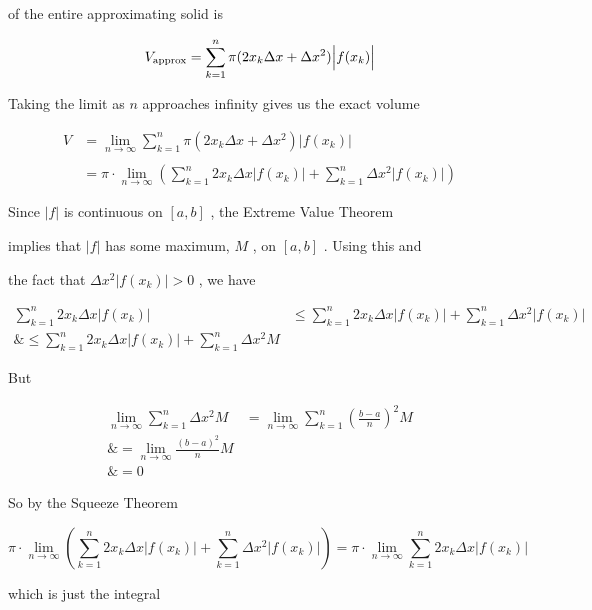 of the entire approximating solid is



$$V _{\rm approx}=\sum _{k=1}^n \pi(2x _k\Delta x+\Delta x^2)\Big|f(x _k)\Big|$$

Taking the limit as $n$ approaches infinity gives us the exact volume



\begin{align} V &= \lim _{n\to\infty}\sum _{k=1}^n \pi(2x _k\Delta x + \Delta x^2)\Big|f(x _k)\Big| \\\\ &= \pi\cdot\lim _{n\to\infty}\left(\sum _{k=1}^n 2x _k\Delta x\Big|f(x _k)\Big| + \sum _{k=1}^n \Delta x^2\Big|f(x _k)\Big|\right) \end{align} 

Since $|f|$ is continuous on $[a,b]$ , the Extreme Value Theorem

implies that $|f|$ has some maximum, $M$ , on $[a,b]$ . Using this and

the fact that $\Delta x^2\Big|f(x _k)\Big|>0$ , we have



\begin{align}
\sum _{k=1}^n 2x _k\Delta x\Big|f(x _k)\Big| &\le \sum _{k=1}^n 2x _k\Delta x\Big|f(x _k)\Big| + \sum _{k=1}^n \Delta x^2\Big|f(x _k)\Big| \\\&\le \sum _{k=1}^n 2x _k\Delta x\Big|f(x _k)\Big| + \sum _{k=1}^n \Delta x^2 M
\end{align}



But



\begin{align}
\lim _{n\to\infty}\sum _{k=1}^n \Delta x^2 M 

&= \lim _{n\to\infty}\sum _{k=1}^n \left(\frac{b-a}{n}\right)^2 M \\\&= \lim _{n\to\infty}\frac{(b-a)^2}{n} M \\\&= 0
\end{align}



So by the Squeeze Theorem



$$\pi\cdot\lim _{n\to\infty}\left(\sum _{k=1}^n 2x _k\Delta x\Big|f(x _k)\Big|+\sum _{k=1}^n \Delta x^2\Big|f(x _k)\Big|\right)=\pi\cdot\lim _{n\to\infty}\sum _{k=1}^n 2x _k\Delta x\Big|f(x _k)\Big|$$

which is just the integral



